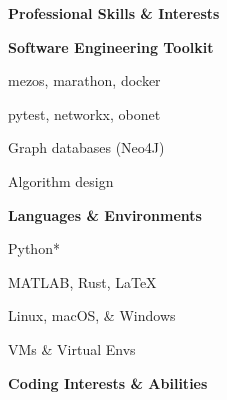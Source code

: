 \documentclass[letterpaper,final]{memoir}
\newcommand{\Sep}{\vspace{1.0em}}
\newcommand{\SmallSep}{\vspace{0.4em}}
\newcommand{\CVSection}[1]
	{\LARGE\textbf{#1}\par
	\SmallSep\normalsize}
\newcommand{\CVItem}[1]
	{\textbf{\color{Blue} #1}}
\begin{document}

\notoserif \CVSection{Professional Skills \& Interests}
\normalfont

\Sep
\CVItem{Software Engineering Toolkit}
\SmallSep

\begin{multicols}{4}

    \begin{compactitem}[\color{Blue}$\circ$]
		
		\item mezos, marathon, docker
        \SmallSep
        
        \item pytest, networkx, obonet
        \SmallSep
        
        \item Graph databases (Neo4J)
        \SmallSep
        
        \item Algorithm design
        
    
	\end{compactitem}

\end{multicols}


\CVItem{Languages \& Environments}
\SmallSep

\begin{multicols}{4}

    \begin{compactitem}[\color{Blue}$\circ$]
		
		\item Python*
        \SmallSep
        
        \item MATLAB, Rust, LaTeX
		\SmallSep
        
        \item Linux, macOS, \& Windows
        \SmallSep

        \item VMs \& Virtual Envs
    
	\end{compactitem}

\end{multicols}


\CVItem{Coding Interests \& Abilities}
\SmallSep
\end{document}
